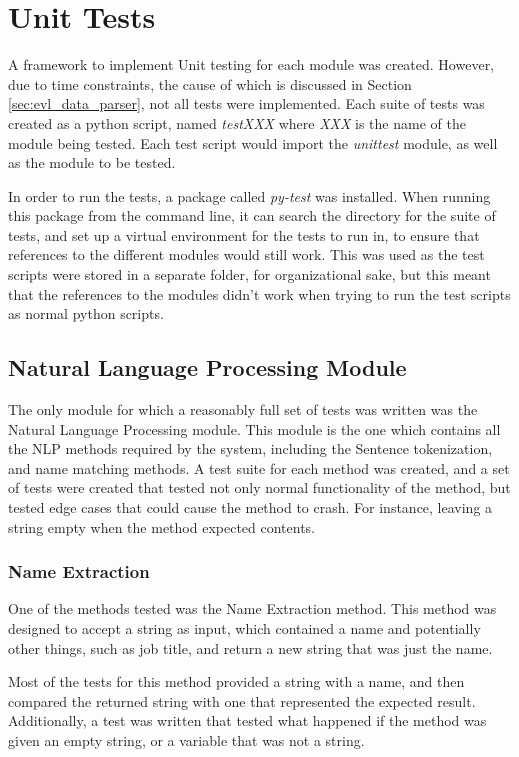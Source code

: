 \section{Unit Tests}

A framework to implement Unit testing for each module was created. However, due to time constraints, the cause of which is discussed in Section \ref{sec:evl_data_parser}, not all tests were implemented. Each suite of tests was created as a python script, named \emph{test\textunderscore XXX} where \emph{XXX} is the name of the module being tested. Each test script would import the \emph{unittest} module, as well as the module to be tested.

In order to run the tests, a package called \emph{py-test} was installed. When running this package from the command line, it can search the directory for the suite of tests, and set up a virtual environment for the tests to run in, to ensure that references to the different modules would still work. This was used as the test scripts were stored in a separate folder, for organizational sake, but this meant that the references to the modules didn't work when trying to run the test scripts as normal python scripts. 

\subsection{Natural Language Processing Module}

The only module for which a reasonably full set of tests was written was the Natural Language Processing module. This module is the one which contains all the NLP methods required by the system, including the Sentence tokenization, and name matching methods. A test suite for each method was created, and a set of tests were created that tested not only normal functionality of the method, but tested edge cases that could cause the method to crash. For instance, leaving a string empty when the method expected contents.

\subsubsection{Name Extraction}

One of the methods tested was the Name Extraction method. This method was designed to accept a string as input, which contained a name and potentially other things, such as job title, and return a new string that was just the name.

Most of the tests for this method provided a string with a name, and then compared the returned string with one that represented the expected result. Additionally, a test was written that tested what happened if the method was given an empty string, or a variable that was not a string.

